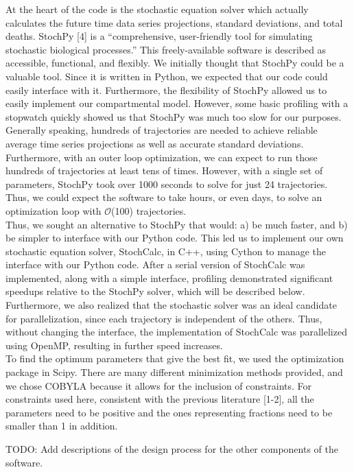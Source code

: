 \documentclass[11pt,letter]{article}
\begin{document}
At the heart of the code is the stochastic equation solver which actually calculates the future time data series projections, standard deviations, and total deaths. StochPy [4] is a ``comprehensive, user-friendly tool for simulating stochastic biological processes.'' This freely-available software is described as accessible, functional, and flexibly. We initially thought that StochPy could be a valuable tool. Since it is written in Python, we expected that our code could easily interface with it. Furthermore, the flexibility of StochPy allowed us to easily implement our compartmental model. However, some basic profiling with a stopwatch quickly showed us that StochPy was much too slow for our purposes. Generally speaking, hundreds of trajectories are needed to achieve reliable average time series projections as well as accurate standard deviations. Furthermore, with an outer loop optimization, we can expect to run those hundreds of trajectories at least tens of times. However, with a single set of parameters, StochPy took over 1000 seconds to solve for just 24 trajectories. Thus, we could expect the software to take hours, or even days, to solve an optimization loop with $\mathcal{O}$(100) trajectories.\\

Thus, we sought an alternative to StochPy that would: a) be much faster, and b) be simpler to interface with our Python code. This led us to implement our own stochastic equation solver, StochCalc, in C++, using Cython to manage the interface with our Python code. After a serial version of StochCalc was implemented, along with a simple interface, profiling demonstrated significant speedups relative to the StochPy solver, which will be described below. Furthermore, we also realized that the stochastic solver was an ideal candidate for parallelization, since each trajectory is independent of the others. Thus, without changing the interface, the implementation of StochCalc was parallelized using OpenMP, resulting in further speed increases.\\

To find the optimum parameters that give the best fit, we used the optimization package in Scipy. There are many different minimization methods provided, and we chose COBYLA because it allows for the inclusion of constraints. For constraints used here, consistent with the previous literature [1-2], all the parameters need to be positive and the ones representing fractions need to be smaller than 1 in addition.

TODO: Add descriptions of the design process for the other components of the software.\\
\end{document}
